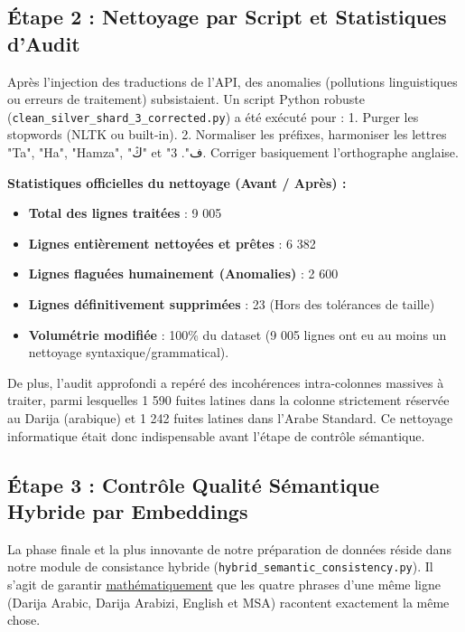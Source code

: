 \documentclass[12pt,a4paper]{article}
\begin{document}
\subsection{Étape 2 : Nettoyage par Script et Statistiques d'Audit}
Après l'injection des traductions de l'API, des anomalies (pollutions linguistiques ou erreurs de traitement) subsistaient. Un script Python robuste (\texttt{clean\_silver\_shard\_3\_corrected.py}) a été exécuté pour :
1. Purger les stopwords (NLTK ou built-in).
2. Normaliser les préfixes, harmoniser les lettres "Ta", "Ha", "Hamza", "ڭ" et "ف".
3. Corriger basiquement l'orthographe anglaise.

\textbf{Statistiques officielles du nettoyage (Avant / Après) :}
\begin{itemize}
    \item \textbf{Total des lignes traitées} : 9 005
    \item \textbf{Lignes entièrement nettoyées et prêtes} : 6 382
    \item \textbf{Lignes flaguées humainement (Anomalies)} : 2 600
    \item \textbf{Lignes définitivement supprimées} : 23 (Hors des tolérances de taille)
    \item \textbf{Volumétrie modifiée} : 100\% du dataset (9 005 lignes ont eu au moins un nettoyage syntaxique/grammatical).
\end{itemize}

De plus, l'audit approfondi a repéré des incohérences intra-colonnes massives à traiter, parmi lesquelles 1 590 fuites latines dans la colonne strictement réservée au Darija (arabique) et 1 242 fuites latines dans l'Arabe Standard. Ce nettoyage informatique était donc indispensable avant l'étape de contrôle sémantique.

\subsection{Étape 3 : Contrôle Qualité Sémantique Hybride par Embeddings}
La phase finale et la plus innovante de notre préparation de données réside dans notre module de consistance hybride (\texttt{hybrid\_semantic\_consistency.py}).
Il s'agit de garantir \underline{mathématiquement} que les quatre phrases d'une même ligne (Darija Arabic, Darija Arabizi, English et MSA) racontent exactement la même chose.
\end{document}
